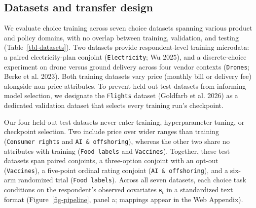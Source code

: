 \documentclass[
  11pt,
  letterpaper,
]{article}
\begin{document}
\subsection{Datasets and transfer
design}\label{datasets-and-transfer-design}

We evaluate choice training across seven choice datasets spanning
various product and policy domains, with no overlap between training,
validation, and testing (Table~\ref{tbl-datasets}). Two datasets provide
respondent-level training microdata: a paired electricity-plan conjoint
(\texttt{Electricity}; Wu 2025), and a discrete-choice experiment on
drone versus ground delivery across four vendor contexts
(\texttt{Drones}; Berke et al. 2023). Both training datasets vary price
(monthly bill or delivery fee) alongside non-price attributes. To
prevent held-out test datasets from informing model selection, we
designate the \texttt{Flights} dataset (Goldfarb et al. 2026) as a
dedicated validation dataset that selects every training run's
checkpoint.

Our four held-out test datasets never enter training, hyperparameter
tuning, or checkpoint selection. Two include price over wider ranges
than training (\texttt{Consumer\ rights} and
\texttt{AI\ \&\ offshoring}), whereas the other two share no attributes
with training (\texttt{Food\ labels} and \texttt{Vaccines}). Together,
these test datasets span paired conjoints, a three-option conjoint with
an opt-out (\texttt{Vaccines}), a five-point ordinal rating conjoint
(\texttt{AI\ \&\ offshoring}), and a six-arm randomized trial
(\texttt{Food\ labels}). Across all seven datasets, each choice task
conditions on the respondent's observed covariates \(\mathbf{s}_t\) in a
standardized text format (Figure~\ref{fig-pipeline}, panel a; mappings
appear in the Web Appendix).
\end{document}
